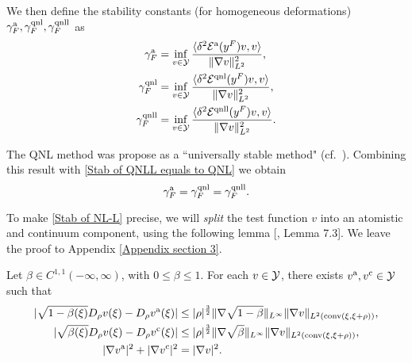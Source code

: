 We then define the stability constants (for homogeneous deformations) $\gamma^{{\rm a}}_{F}, \gamma^{{\rm qnl}}_{F}, \gamma^{{\rm qnll}}_{F}$ as 
\begin{align}
	\label{GammaF for a}  \gamma^{{\rm a}}_{F} &=\inf_{v\in \mathcal{Y}} \frac{\langle \delta^{2} \mathcal{E}^{{\rm a}} (y^{F})v,v\rangle}{\Vert \nabla v \Vert_{L^{2}}^{2}},\\
	\label{GammaF for rfl} \gamma^{{\rm qnl}}_{F} &=\inf_{v\in \mathcal{Y}} \frac{\langle \delta^{2} \mathcal{E}^{{\rm qnl}} (y^{F})v,v\rangle}{\Vert \nabla v \Vert_{L^{2}}^{2}},\\
	\label{GammaF for nll}\gamma^{{\rm qnll}}_{F} &=\inf_{v\in \mathcal{Y}} \frac{\langle \delta^{2} \mathcal{E}^{{\rm qnll}} (y^{F})v,v\rangle}{\Vert \nabla v \Vert_{L^{2}}^{2}}.
\end{align}

The QNL method was propose as a ``universally stable method" (cf.~\cite[Theoorem 4.3]{2014_CO_AS_LZ_Stabilization_MMS}). Combining this result with \eqref{Stab of QNLL equals to QNL} we obtain
\begin{equation}\label{Stab constants of three methods result}
	\gamma^{{\rm a}}_{F} = \gamma^{{\rm qnl}}_{F} =\gamma^{{\rm qnll}}_{F}.
\end{equation}

To make \eqref{Stab of NL-L} precise, we will 
{\it split} the test function $v$ into an atomistic and continuum component, using the following lemma [\cite{2013_ML_CO_AC_Coupling_ACTANUM}, Lemma 7.3]. We leave the proof to Appendix \ref{Appendix section 3}.

\begin{lemma}\label{Pointwise blending lemma}
	Let $\beta \in C^{1,1}(-\infty,\infty)$, with $0\le \beta \le 1$. For each $v\in \mathcal{Y}$, there exists $v^{\text{a}}, v^{\text{c}} \in \mathcal{Y}$ such that
	\begin{align}
		\label{Pointwise va blending estimate}\vert \sqrt{1-\beta(\xi)} D_{\rho}v(\xi)-D_{\rho}v^{\text{a}}(\xi) \vert &\le \vert \rho \vert^{\frac{3}{2}}\Vert \nabla \sqrt{1-\beta}\Vert_{L^{\infty}} \Vert \nabla v \Vert_{L^{2}({\rm conv}(\xi,\xi+\rho))},\\ 
		\label{Pointwise vc blending estimate1}\vert \sqrt{\beta(\xi)} D_{\rho}v(\xi)-D_{\rho}v^{\text{c}}(\xi) \vert &\le \vert \rho \vert^{\frac{3}{2}}\Vert \nabla \sqrt{\beta}\Vert_{L^{\infty}} \Vert \nabla v \Vert_{L^{2}({\rm conv}(\xi,\xi+\rho))},\\ 
		\label{va and vc} \vert \nabla v^{\text{a}}\vert^{2} +	\vert \nabla v^{\text{c}}\vert^{2} &= \vert \nabla v \vert^{2}.
	\end{align}
\end{lemma}

